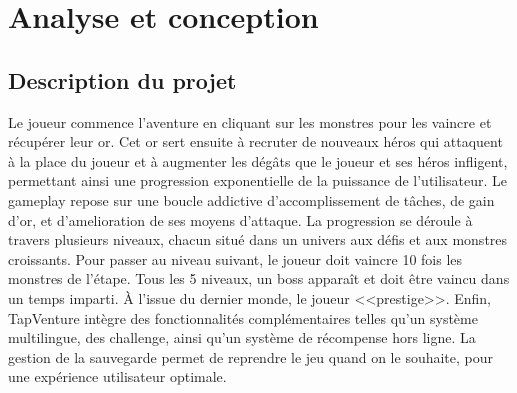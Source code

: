 \documentclass[11pt,a4paper]{article}
\begin{document}
\section{Analyse et conception}

\subsection{Description du projet}
Le joueur commence l'aventure en cliquant sur les monstres pour les vaincre et récupérer leur or. Cet or sert ensuite à recruter de nouveaux héros qui attaquent à la place du joueur et à
augmenter les dégâts que le joueur et ses héros infligent, permettant ainsi une progression exponentielle de la puissance de l'utilisateur.
Le gameplay repose sur une boucle addictive d’accomplissement de tâches, de gain d'or, et d’\gls{amelioration} de ses moyens d’attaque.
La progression se déroule à travers plusieurs niveaux, chacun situé dans un univers aux défis et aux monstres croissants. Pour passer au niveau suivant, le joueur doit vaincre 10 fois
les monstres de l’étape. Tous les 5 niveaux, un boss apparaît et doit être vaincu dans un temps imparti. À l’issue du dernier monde, le joueur <<\gls{prestige}>>.
Enfin, TapVenture intègre des fonctionnalités complémentaires telles qu’un système multilingue, des \gls{challenge}, ainsi qu’un système de récompense \gls{hors ligne}. La gestion de la
sauvegarde permet de reprendre le jeu quand on le souhaite, pour une expérience utilisateur optimale.
\end{document}
